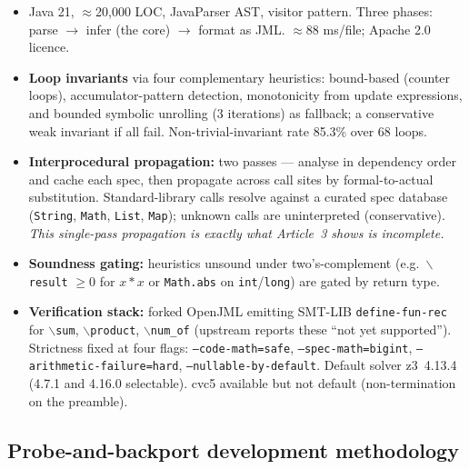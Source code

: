 \documentclass[11pt]{article}
\begin{document}
\begin{itemize}[leftmargin=1.4em,itemsep=0.1em]
  \item Java 21, $\approx$20{,}000 LOC, JavaParser AST, visitor pattern.
        Three phases: parse $\to$ infer (the core) $\to$ format as JML.
        $\approx$88 ms/file; Apache 2.0 licence.
  \item \textbf{Loop invariants} via four complementary heuristics:
        bound-based (counter loops), accumulator-pattern detection,
        monotonicity from update expressions, and bounded symbolic unrolling
        (3 iterations) as fallback; a conservative weak invariant if all fail.
        Non-trivial-invariant rate 85.3\% over 68 loops.
  \item \textbf{Interprocedural propagation:} two passes --- analyse in
        dependency order and cache each spec, then propagate across call sites
        by formal-to-actual substitution. Standard-library calls resolve
        against a curated spec database (\texttt{String}, \texttt{Math},
        \texttt{List}, \texttt{Map}); unknown calls are uninterpreted
        (conservative). \emph{This single-pass propagation is exactly what
        Article~3 shows is incomplete.}
  \item \textbf{Soundness gating:} heuristics unsound under two's-complement
        (e.g.\ $\backslash$\texttt{result} $\ge 0$ for $x*x$ or
        \texttt{Math.abs} on \texttt{int}/\texttt{long}) are gated by return
        type.
  \item \textbf{Verification stack:} forked OpenJML emitting SMT-LIB
        \texttt{define-fun-rec} for $\backslash$\texttt{sum},
        $\backslash$\texttt{product}, $\backslash$\texttt{num\_of} (upstream
        reports these ``not yet supported''). Strictness fixed at four flags:
        \texttt{--code-math=safe}, \texttt{--spec-math=bigint},
        \texttt{--arithmetic-failure=hard}, \texttt{--nullable-by-default}.
        Default solver z3~4.13.4 (4.7.1 and 4.16.0 selectable). cvc5 available
        but not default (non-termination on the preamble).
\end{itemize}

\subsection{Probe-and-backport development methodology}
\end{document}
